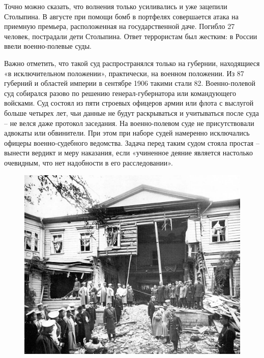 Точно можно сказать, что волнения только усиливались и уже зацепили Столыпина. В августе при помощи бомб в портфелях совершается атака на приемную премьера, расположенная на государственной даче. Погибло 27 человек, пострадали дети Столыпина. Ответ террористам был жестким: в России ввели военно-полевые суды.

Важно отметить, что такой суд распространялся только на губернии, находящиеся «в исключительном положении», практически, на военном положении. Из 87 губерний и областей империи в сентябре 1906 такими стали 82. Военно-полевой суд собирался разово по решению генерал-губернатора или командующего войсками. Суд состоял из пяти строевых офицеров армии или флота с выслугой больше четырех лет, чьи данные не будут раскрываться и учитываться после суда – не велся даже протокол заседания. На военно-полевом суде не присутствовали адвокаты или обвинители. При этом при наборе судей намеренно исключались офицеры военно-судебного ведомства. Задача перед таким судом стояла простая – вынести вердикт и меру наказания, если «учиненное деяние является настолько очевидным, что нет надобности в его расследовании».
\begin{figure}[h!tb] 
	\centering\includegraphics[scale=0.4]{Stolypin2/zU206u1v7wY.jpg}
\end{figure}
